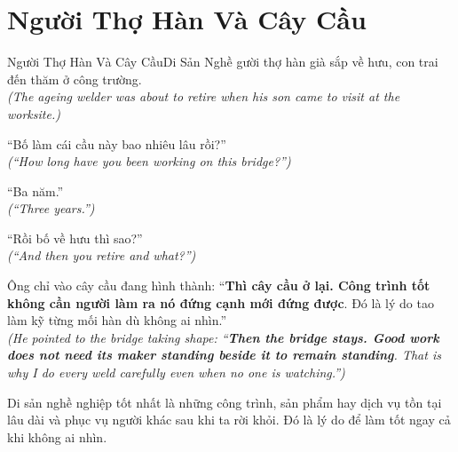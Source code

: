 \section{Người Thợ Hàn Và Cây Cầu}
\begin{truyen}{Người Thợ Hàn Và Cây Cầu}{Di Sản Nghề}
gười thợ hàn già sắp về hưu, con trai đến thăm ở công trường.\\
\textit{(The ageing welder was about to retire when his son came to visit at the worksite.)}

``Bố làm cái cầu này bao nhiêu lâu rồi?''\\
\textit{(``How long have you been working on this bridge?'')}

``Ba năm.''\\
\textit{(``Three years.'')}

``Rồi bố về hưu thì sao?''\\
\textit{(``And then you retire and what?'')}

Ông chỉ vào cây cầu đang hình thành: ``\textbf{Thì cây cầu ở lại. Công trình tốt không cần người làm ra nó đứng cạnh mới đứng được}. Đó là lý do tao làm kỹ từng mối hàn dù không ai nhìn.''\\
\textit{(He pointed to the bridge taking shape: ``\textbf{Then the bridge stays. Good work does not need its maker standing beside it to remain standing}. That is why I do every weld carefully even when no one is watching.'')}
\end{truyen}
\begin{baihoc}
  Di sản nghề nghiệp tốt nhất là những công trình, sản phẩm hay dịch vụ tồn tại lâu dài và phục vụ người khác sau khi ta rời khỏi. Đó là lý do để làm tốt ngay cả khi không ai nhìn.
\end{baihoc}

